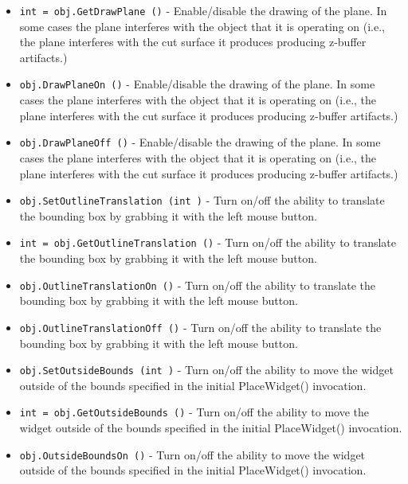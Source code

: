 \begin{itemize}
\item  \verb|int = obj.GetDrawPlane ()| -  Enable/disable the drawing of the plane. In some cases the plane
 interferes with the object that it is operating on (i.e., the
 plane interferes with the cut surface it produces producing
 z-buffer artifacts.)

\item  \verb|obj.DrawPlaneOn ()| -  Enable/disable the drawing of the plane. In some cases the plane
 interferes with the object that it is operating on (i.e., the
 plane interferes with the cut surface it produces producing
 z-buffer artifacts.)

\item  \verb|obj.DrawPlaneOff ()| -  Enable/disable the drawing of the plane. In some cases the plane
 interferes with the object that it is operating on (i.e., the
 plane interferes with the cut surface it produces producing
 z-buffer artifacts.)

\item  \verb|obj.SetOutlineTranslation (int )| -  Turn on/off the ability to translate the bounding box by grabbing it
 with the left mouse button.

\item  \verb|int = obj.GetOutlineTranslation ()| -  Turn on/off the ability to translate the bounding box by grabbing it
 with the left mouse button.

\item  \verb|obj.OutlineTranslationOn ()| -  Turn on/off the ability to translate the bounding box by grabbing it
 with the left mouse button.

\item  \verb|obj.OutlineTranslationOff ()| -  Turn on/off the ability to translate the bounding box by grabbing it
 with the left mouse button.

\item  \verb|obj.SetOutsideBounds (int )| -  Turn on/off the ability to move the widget outside of the bounds
 specified in the initial PlaceWidget() invocation.

\item  \verb|int = obj.GetOutsideBounds ()| -  Turn on/off the ability to move the widget outside of the bounds
 specified in the initial PlaceWidget() invocation.

\item  \verb|obj.OutsideBoundsOn ()| -  Turn on/off the ability to move the widget outside of the bounds
 specified in the initial PlaceWidget() invocation.


\end{itemize}
